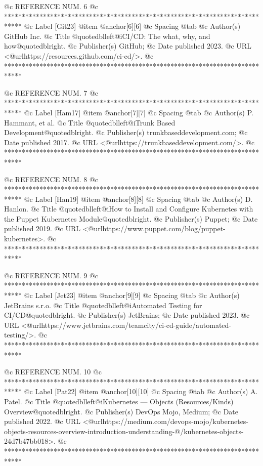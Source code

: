 @c REFERENCE NUM. 6
@c *****************************************************************************
@c Label [Git23]
@item @anchor{[6]}[6]
@c Spacing
@tab
@c Author(s)
GitHub Inc.
@c Title
@quotedblleft{}@i{CI/CD: The what, why, and how}@quotedblright{}.
@c Publisher(s)
GitHub;
@c Date published
2023.
@c URL
<@url{https://resources.github.com/ci-cd/}>.
@c *****************************************************************************

@c REFERENCE NUM. 7
@c *****************************************************************************
@c Label [Ham17]
@item @anchor{[7]}[7]
@c Spacing
@tab
@c Author(s)
P. Hammant, et al.
@c Title
@quotedblleft{}@i{Trunk Based Development}@quotedblright{}.
@c Publisher(s)
trunkbaseddevelopment.com;
@c Date published
2017.
@c URL
<@url{https://trunkbaseddevelopment.com/}>.
@c *****************************************************************************

@c REFERENCE NUM. 8
@c *****************************************************************************
@c Label [Han19]
@item @anchor{[8]}[8]
@c Spacing
@tab
@c Author(s)
D. Hanlon.
@c Title
@quotedblleft{}@i{How to Install and Configure Kubernetes with the Puppet Kubernetes Module}@quotedblright{}.
@c Publisher(s)
Puppet;
@c Date published
2019.
@c URL
<@url{https://www.puppet.com/blog/puppet-kubernetes}>.
@c *****************************************************************************

@c REFERENCE NUM. 9
@c *****************************************************************************
@c Label [Jet23]
@item @anchor{[9]}[9]
@c Spacing
@tab
@c Author(s)
JetBrains s.r.o.
@c Title
@quotedblleft{}@i{Automated Testing for CI/CD}@quotedblright{}.
@c Publisher(s)
JetBrains;
@c Date published
2023.
@c URL
<@url{https://www.jetbrains.com/teamcity/ci-cd-guide/automated-testing/}>.
@c *****************************************************************************

@c REFERENCE NUM. 10
@c *****************************************************************************
@c Label [Pat22]
@item @anchor{[10]}[10]
@c Spacing
@tab
@c Author(s)
A. Patel.
@c Title
@quotedblleft{}@i{Kubernetes — Objects (Resources/Kinds) Overview}@quotedblright{}.
@c Publisher(s)
DevOps Mojo, Medium;
@c Date published
2022.
@c URL
<@url{https://medium.com/devops-mojo/kubernetes-objects-resources-overview-introduction-understanding-@/kubernetes-objects-24d7b47bb018}>.
@c *****************************************************************************


